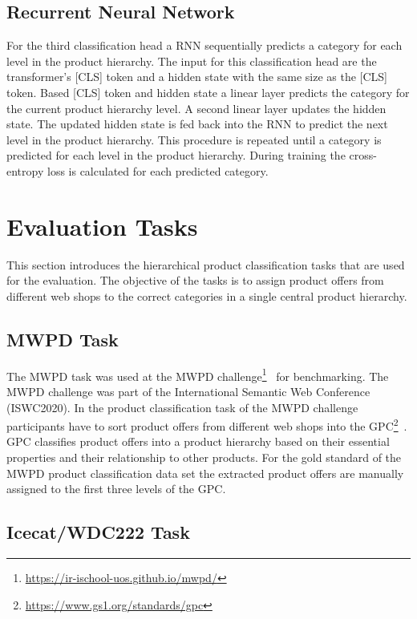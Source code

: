 \documentclass[11pt,dvipdfm]{article}
\begin{document}
\subsection{Recurrent Neural Network}
For the third classification head a \ac{RNN} sequentially predicts a category for each level in the product hierarchy.
The input for this classification head are the transformer's [CLS] token and a hidden state with the same size as the [CLS] token.
Based [CLS] token and hidden state a linear layer predicts the category for the current product hierarchy level.
A second linear layer updates the hidden state.
The updated hidden state is fed back into the \ac{RNN} to predict the next level in the product hierarchy.
This procedure is repeated until a category is predicted for each level in the product hierarchy.
During training the cross-entropy loss is calculated for each predicted category.

\section{Evaluation Tasks}
\label{sec:eval_task}

This section introduces the hierarchical product classification tasks that are used for the evaluation.
The objective of the tasks is to assign product offers from different web shops to the correct categories in a single central product hierarchy.

\subsection{MWPD Task}

The MWPD task was used at the \ac{MWPD} challenge\footnote{\url{https://ir-ischool-uos.github.io/mwpd/}}~\cite{zhang_mwpd2020_2020} for benchmarking.
The \ac{MWPD} challenge was part of the International Semantic Web Conference (ISWC2020).
In the product classification task of the \ac{MWPD} challenge participants have to sort product offers from different web shops into the \ac{GPC}\footnote{\url{https://www.gs1.org/standards/gpc}}~\cite{zhang_mwpd2020_2020}.
\ac{GPC} classifies product offers into a product hierarchy based on their essential properties and their relationship to other products.
For the gold standard of the \ac{MWPD} product classification data set the extracted product offers are manually assigned to the first three levels of the \ac{GPC}.

\subsection{Icecat/WDC222 Task}
\end{document}
